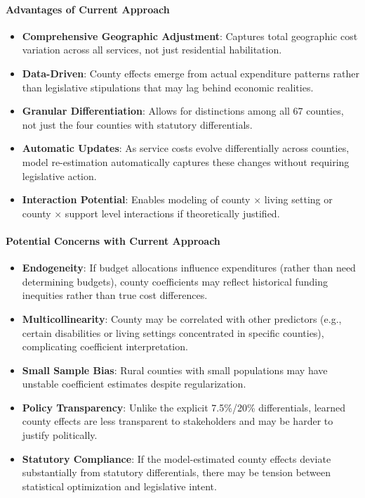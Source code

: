 \paragraph{Advantages of Current Approach}
\begin{itemize}
    \item \textbf{Comprehensive Geographic Adjustment}: Captures total geographic cost variation across all services, not just residential habilitation.
    
    \item \textbf{Data-Driven}: County effects emerge from actual expenditure patterns rather than legislative stipulations that may lag behind economic realities.
    
    \item \textbf{Granular Differentiation}: Allows for distinctions among all 67 counties, not just the four counties with statutory differentials.
    
    \item \textbf{Automatic Updates}: As service costs evolve differentially across counties, model re-estimation automatically captures these changes without requiring legislative action.
    
    \item \textbf{Interaction Potential}: Enables modeling of county $\times$ living setting or county $\times$ support level interactions if theoretically justified.
\end{itemize}

\paragraph{Potential Concerns with Current Approach}
\begin{itemize}
    \item \textbf{Endogeneity}: If budget allocations influence expenditures (rather than need determining budgets), county coefficients may reflect historical funding inequities rather than true cost differences.
    
    \item \textbf{Multicollinearity}: County may be correlated with other predictors (e.g., certain disabilities or living settings concentrated in specific counties), complicating coefficient interpretation.
    
    \item \textbf{Small Sample Bias}: Rural counties with small populations may have unstable coefficient estimates despite regularization.
    
    \item \textbf{Policy Transparency}: Unlike the explicit 7.5\%/20\% differentials, learned county effects are less transparent to stakeholders and may be harder to justify politically.
    
    \item \textbf{Statutory Compliance}: If the model-estimated county effects deviate substantially from statutory differentials, there may be tension between statistical optimization and legislative intent.
\end{itemize}

